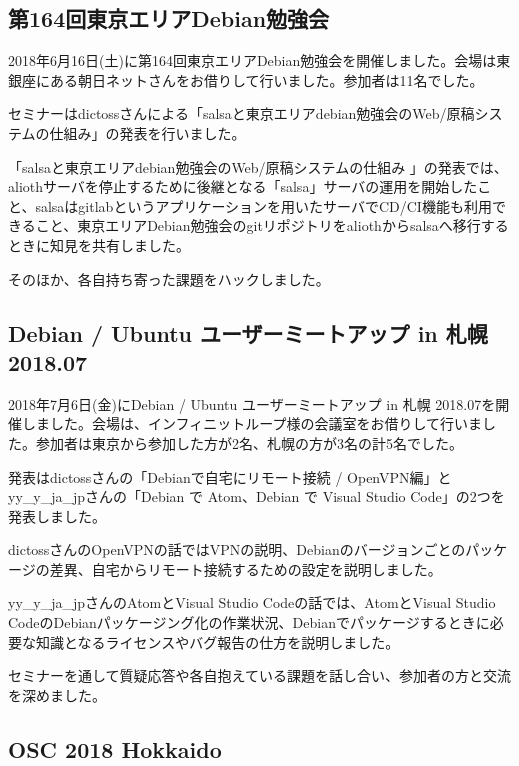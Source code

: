 \documentclass[mingoth,a4paper]{jsarticle}
\begin{document}

\subsection{第164回東京エリアDebian勉強会}

2018年6月16日(土)に第164回東京エリアDebian勉強会を開催しました。会場は東銀座にある朝日ネットさんをお借りして行いました。参加者は11名でした。

セミナーはdictossさんによる「salsaと東京エリアdebian勉強会のWeb/原稿システムの仕組み」の発表を行いました。

「salsaと東京エリアdebian勉強会のWeb/原稿システムの仕組み 」の発表では、aliothサーバを停止するために後継となる「salsa」サーバの運用を開始したこと、salsaはgitlabというアプリケーションを用いたサーバでCD/CI機能も利用できること、東京エリアDebian勉強会のgitリポジトリをaliothからsalsaへ移行するときに知見を共有しました。

そのほか、各自持ち寄った課題をハックしました。

\subsection{Debian / Ubuntu ユーザーミートアップ in 札幌 2018.07}

2018年7月6日(金)にDebian / Ubuntu ユーザーミートアップ in 札幌 2018.07を開催しました。会場は、インフィニットループ様の会議室をお借りして行いました。参加者は東京から参加した方が2名、札幌の方が3名の計5名でした。

発表はdictossさんの「Debianで自宅にリモート接続 / OpenVPN編」とyy\_y\_ja\_jpさんの「Debian で Atom、Debian で Visual Studio Code」の2つを発表しました。

dictossさんのOpenVPNの話ではVPNの説明、Debianのバージョンごとのパッケージの差異、自宅からリモート接続するための設定を説明しました。

yy\_y\_ja\_jpさんのAtomとVisual Studio Codeの話では、AtomとVisual Studio CodeのDebianパッケージング化の作業状況、Debianでパッケージするときに必要な知識となるライセンスやバグ報告の仕方を説明しました。

セミナーを通して質疑応答や各自抱えている課題を話し合い、参加者の方と交流を深めました。


\subsection{OSC 2018 Hokkaido}
\end{document}

